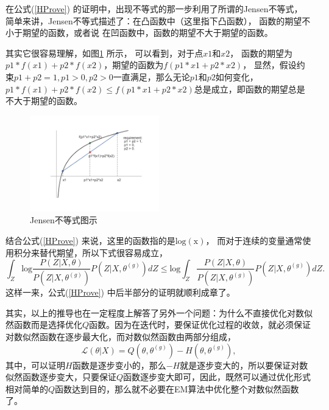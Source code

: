 \documentclass[UTF8]{ctexart}
\begin{document}
在公式(\ref{HProve}) 的证明中，出现不等式的那一步利用了所谓的Jensen不等式，
简单来讲，Jensen不等式描述了：在凸函数中（这里指下凸函数），
函数的期望不小于期望的函数，或者说
在凹函数中，函数的期望不大于期望的函数。

其实它很容易理解，如图\ref{FigJensen} 所示，
可以看到，对于点$x1$和$x2$，
函数的期望为$p1*f(x1)+p2*f(x2)$，期望的函数为$f(p1*x1+p2*x2)$，
显然，假设约束$p1+p2=1, p1>0, p2>0$一直满足，那么无论$p1$和$p2$如何变化，
$p1*f(x1)+p2*f(x2) \le f(p1*x1+p2*x2)$总是成立，即函数的期望总是不大于期望的函数。

\begin{figure}[!h]
  \includegraphics[width=0.5\textwidth]{./figures/Jensen.pdf}
  \centering
  \caption{Jensen不等式图示}
  \label{FigJensen}
\end{figure}

结合公式(\ref{HProve}) 来说，这里的函数指的是$\mathrm{log(x)}$，
而对于连续的变量通常使用积分来替代期望，所以下式很容易成立，
\begin{equation}\label{JensenInHP}
  \int_{Z}\mathrm{log}\frac{P(Z|X,\theta)}{P\left(Z|X,\theta^{(g)}\right)}P\left(Z|X,\theta^{(g)}\right)dZ
  \le \mathrm{log}\int_{Z}\frac{P(Z|X,\theta)}{P\left(Z|X,\theta^{(g)}\right)}P\left(Z|X,\theta^{(g)}\right)dZ.
\end{equation}
这样一来，公式(\ref{HProve}) 中后半部分的证明就顺利成章了。

其实，以上的推导也在一定程度上解答了另外一个问题：为什么不直接优化对数似然函数而是选择优化$Q$函数。因为在迭代时，要保证优化过程的收敛，就必须保证对数似然函数在逐步最大化，而对数似然函数由两部分组成，
\begin{equation}
  \mathcal{L}(\theta|X) = Q \left(\theta, \theta^{(g)} \right) - H \left(\theta, \theta^{(g)} \right),
\end{equation}
其中，可以证明$H$函数是逐步变小的，那么$-H$就是逐步变大的，所以要保证对数似然函数逐步变大，只要保证$Q$函数逐步变大即可，因此，既然可以通过优化形式相对简单的$Q$函数达到目的，那么就不必要在EM算法中优化整个对数似然函数了。
\end{document}
